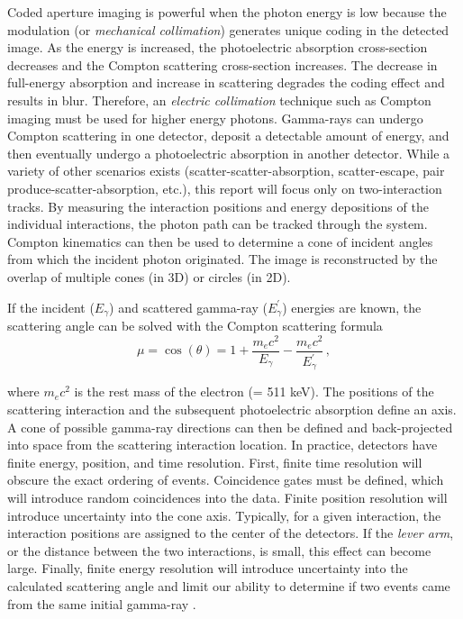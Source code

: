 \documentclass[10pt]{article}
\begin{document}
Coded aperture imaging is powerful when the photon energy is low because the modulation (or \emph{mechanical collimation}) generates unique coding in the detected image. As the energy is increased, the photoelectric absorption cross-section decreases and the Compton scattering cross-section increases. The decrease in full-energy absorption and increase in scattering degrades the coding effect and results in blur. Therefore, an \emph{electric collimation} technique such as Compton imaging must be used for higher energy photons. Gamma-rays can undergo Compton scattering in one detector, deposit a detectable amount of energy, and then eventually undergo a photoelectric absorption in another detector. While a variety of other scenarios exists (scatter-scatter-absorption, scatter-escape, pair produce-scatter-absorption, etc.), this report will focus only on two-interaction tracks. By measuring the interaction positions and energy depositions of the individual interactions, the photon path can be tracked through the system. Compton kinematics can then be used to determine a cone of incident angles from which the incident photon originated. The image is reconstructed by the overlap of multiple cones (in 3D) or circles (in 2D).

If the incident ($E_\gamma$) and scattered gamma-ray ($E_\gamma^\prime$) energies are known, the scattering angle can be solved with the Compton scattering formula
%
\begin{equation}
\mu = \cos(\theta) = 1 + \frac{m_e c^2}{E_\gamma} - \frac{m_e c^2}{E_\gamma^\prime}\,,
\end{equation}

\noindent where $m_e c^2$ is the rest mass of the electron (= 511 keV). The positions of the scattering interaction and the subsequent photoelectric absorption define an axis. A cone of possible gamma-ray directions can then be defined and back-projected into space from the scattering interaction location. In practice, detectors have finite energy, position, and time resolution. First, finite time resolution will obscure the exact ordering of events. Coincidence gates must be defined, which will introduce random coincidences into the data. Finite position resolution will introduce uncertainty into the cone axis. Typically, for a given interaction, the interaction positions are assigned to the center of the detectors. If the \emph{lever arm}, or the distance between the two interactions, is small, this effect can become large. Finally, finite energy resolution will introduce uncertainty into the calculated scattering angle and limit our ability to determine if two events came from the same initial gamma-ray \cite{Lehner2004}.
\end{document}
